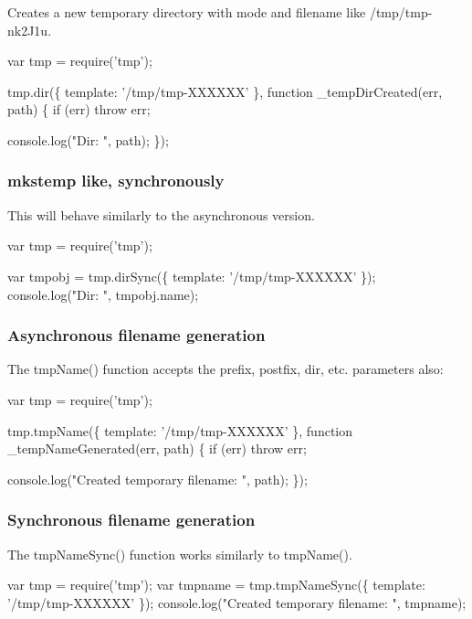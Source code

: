 Creates a new temporary directory with mode {} and filename like {\ttfamily /tmp/tmp-\/nk2\+J1u}.


\begin{DoxyCode}
var tmp = require('tmp');

tmp.dir(\{ template: '/tmp/tmp-XXXXXX' \}, function \_tempDirCreated(err, path) \{
  if (err) throw err;

  console.log("Dir: ", path);
\});
\end{DoxyCode}


\subsubsection*{mkstemp like, synchronously}

This will behave similarly to the asynchronous version.


\begin{DoxyCode}
var tmp = require('tmp');

var tmpobj = tmp.dirSync(\{ template: '/tmp/tmp-XXXXXX' \});
console.log("Dir: ", tmpobj.name);
\end{DoxyCode}


\subsubsection*{Asynchronous filename generation}

The {\ttfamily tmp\+Name()} function accepts the {\ttfamily prefix}, {\ttfamily postfix}, {\ttfamily dir}, etc. parameters also\+:


\begin{DoxyCode}
var tmp = require('tmp');

tmp.tmpName(\{ template: '/tmp/tmp-XXXXXX' \}, function \_tempNameGenerated(err, path) \{
    if (err) throw err;

    console.log("Created temporary filename: ", path);
\});
\end{DoxyCode}


\subsubsection*{Synchronous filename generation}

The {\ttfamily tmp\+Name\+Sync()} function works similarly to {\ttfamily tmp\+Name()}.


\begin{DoxyCode}
var tmp = require('tmp');
var tmpname = tmp.tmpNameSync(\{ template: '/tmp/tmp-XXXXXX' \});
console.log("Created temporary filename: ", tmpname);
\end{DoxyCode}


